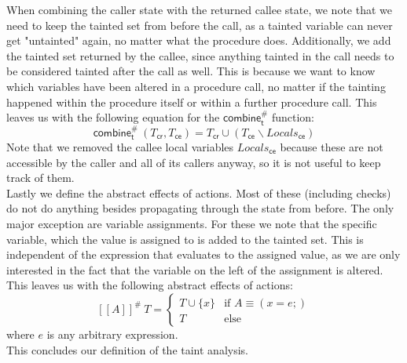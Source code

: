       When combining the caller state with the returned callee state, we note that we need to keep the tainted set from before the call, as a tainted variable can never get "untainted" again, no matter what the procedure does. Additionally, we add the tainted set returned by the callee, since anything tainted in the call needs to be considered tainted after the call as well. This is because we want to know which variables have been altered in a procedure call, no matter if the tainting happened within the procedure itself or within a further procedure call. This leaves us with the following equation for the $\textsf{combine}^{\#}_\textsf{t}$ function:
      \[ \textsf{combine}^{\#}_\textsf{t}\ (T_\textsf{cr}, T_\textsf{ce}) = T_\textsf{cr} \cup (T_\textsf{ce} \backslash Locals_\textsf{ce}) \]
      Note that we removed the callee local variables $Locals_\textsf{ce}$ because these are not accessible by the caller and all of its callers anyway, so it is not useful to keep track of them.\\
      Lastly we define the abstract effects of actions. Most of these (including checks) do not do anything besides propagating through the state from before. The only major exception are variable assignments. For these we note that the specific variable, which the value is assigned to is added to the tainted set. This is independent of the expression that evaluates to the assigned value, as we are only interested in the fact that the variable on the left of the assignment is altered. This leaves us with the following abstract effects of actions:
      \[ [\![ A ]\!] ^{\#}\ T = \left\{ \begin{array}{ll}
        T \cup \{x\} & \text{if }A \equiv (x = e;)\\
        T & \text{else}
      \end{array} \right. \]
      where $e$ is any arbitrary expression.\\
      This concludes our definition of the taint analysis.

